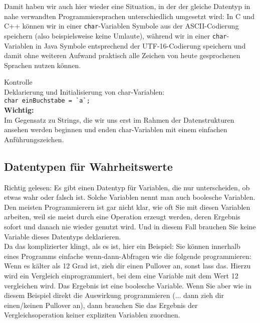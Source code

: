 Damit haben wir auch hier wieder eine Situation, in der der gleiche Datentyp in nahe verwandten Programmiersprachen unterschiedlich umgesetzt wird: In C und C++ können wir in einer \verb|char|-Variablen Symbole aus der ASCII-Codierung speichern (also beispielsweise keine Umlaute), während wir in einer \verb|char|-Variablen in Java Symbole entsprechend der UTF-16-Codierung speichern und damit ohne weiteren Aufwand praktisch alle Zeichen von heute gesprochenen Sprachen nutzen können. 

Kontrolle\\

Deklarierung und Initialisierung von char-Variablen:\\

\verb|char einBuchstabe = `a`;|\\

\textbf{Wichtig:}\\

Im Gegensatz zu Strings, die wir uns erst im Rahmen der Datenstrukturen ansehen werden beginnen und enden char-Variablen mit einem einfachen Anführungszeichen.\\


\subsection{Datentypen für Wahrheitswerte}

Richtig gelesen: Es gibt einen Datentyp für Variablen, die nur unterscheiden, ob etwas wahr oder falsch ist. Solche Variablen nennt man auch boolesche Variablen. Den meisten Programmierern ist gar nicht klar, wie oft Sie mit diesen Variablen arbeiten, weil sie meist durch eine Operation erzeugt werden, deren Ergebnis sofort und danach nie wieder genutzt wird. Und in diesem Fall brauchen Sie keine Variable dieses Datentyps deklarieren.\\

Da das komplizierter klingt, als es ist, hier ein Beispiel: Sie können innerhalb eines Programms einfache wenn-dann-Abfragen wie die folgende programmieren: Wenn es kälter als 12 Grad ist, zieh dir einen Pullover an, sonst lass das. Hierzu wird ein Vergleich einprogrammiert, bei dem eine Variable mit dem Wert 12 vergleichen wird. Das Ergebnis ist eine boolesche Variable. Wenn Sie aber wie in diesem Beispiel direkt die Auswirkung programmieren (... dann zieh dir einen/keinen Pullover an), dann brauchen Sie das Ergebnis der Vergleichsoperation keiner expliziten Variablen zuordnen.\\

